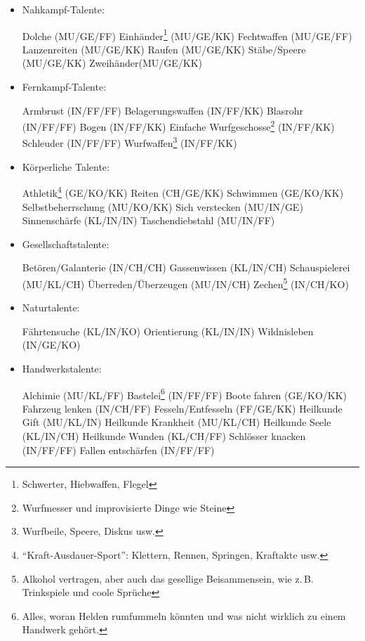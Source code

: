 \begin{itemize}
\item Nahkampf-Talente:
\begin{itemize}
\BTalent Dolche (MU/GE/FF)
\STalent Einhänder\footnote{Schwerter, Hiebwaffen, Flegel} (MU/GE/KK)
\STalent Fechtwaffen (MU/GE/FF)
\STalent Lanzenreiten (MU/GE/KK)
\BTalent Raufen (MU/GE/KK)
\STalent Stäbe/Speere (MU/GE/KK)
\STalent Zweihänder\footnotemark[\value{footnote}] (MU/GE/KK)
\end{itemize}

\pagebreak[3]
\item Fernkampf-Talente:
\begin{itemize}
\STalent Armbrust {(IN/FF/FF)}
\STalent Belagerungswaffen (IN/FF/KK)
\STalent Blasrohr (IN/FF/FF)
\STalent Bogen (IN/FF/KK)
\BTalent Einfache Wurfgeschosse\footnote{Wurfmesser und improvisierte Dinge wie Steine} (IN/FF/KK)
\STalent Schleuder {(IN/FF/FF)}
\STalent Wurfwaffen\footnote{Wurfbeile, Speere, Diskus usw.} (IN/FF/KK)
\end{itemize}

\item Körperliche Talente:
\begin{itemize}
\BTalent Athletik\footnote{``Kraft-Ausdauer-Sport'': Klettern, Rennen, Springen, Kraftakte usw.} (GE/KO/KK)
\STalent Reiten (CH/GE/KK)
\STalent Schwimmen (GE/KO/KK)
\BTalent Selbstbeherrschung (MU/KO/KK)
\BTalent Sich verstecken (MU/IN/GE)
\BTalent Sinnenschärfe (KL/IN/IN)
\STalent Taschendiebstahl (MU/IN/FF)
\end{itemize}

\item Gesellschaftstalente:
\begin{itemize}
\STalent Betören/Galanterie (IN/CH/CH)
\STalent Gassenwissen (KL/IN/CH)
\STalent Schauspielerei (MU/KL/CH)
\BTalent Überreden/Überzeugen (MU/IN/CH)
\STalent Zechen\footnote{Alkohol vertragen, aber auch das gesellige Beisammensein, wie z.\,B. Trinkspiele und coole Sprüche} (IN/CH/KO)
\end{itemize}

\item Naturtalente:
\begin{itemize}
\BTalent Fährtensuche (KL/IN/KO)
\BTalent Orientierung (KL/IN/IN)
\BTalent Wildnisleben (IN/GE/KO)
\end{itemize}

\item Handwerkstalente:
\begin{itemize}
\STalent Alchimie (MU/KL/FF)
\BTalent Bastelei\footnote{Alles, woran Helden rumfummeln könnten und was nicht wirklich zu einem Handwerk gehört.} (IN/FF/FF)
\STalent Boote fahren (GE/KO/KK)
\STalent Fahrzeug lenken (IN/CH/FF)
\STalent Fesseln/Entfesseln (FF/GE/KK)
\STalent Heilkunde Gift (MU/KL/IN)
\STalent Heilkunde Krankheit (MU/KL/CH)
\STalent Heilkunde Seele (KL/IN/CH)
\BTalent Heilkunde Wunden (KL/CH/FF)
\STalent Schlösser knacken (IN/FF/FF)
\STalent Fallen entschärfen (IN/FF/FF)
\end{itemize}


\end{itemize}
